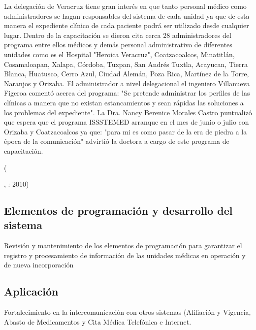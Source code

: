 \begin{center}
  \begin{minipage}{0.9\linewidth}
    \vspace{5pt}%
    {\small
    La delegación de Veracruz tiene gran interés en que tanto personal médico como administradores se hagan responsables del sistema de cada unidad ya que de esta manera el expediente clínico de cada paciente podrá ser utilizado desde cualquier lugar.
    Dentro de la capacitación se dieron cita cerca 28 administradores del programa entre ellos médicos y demás personal administrativo de diferentes unidades como es el Hospital "Heroica Veracruz", Coatzacoalcos, Minatitlán, Cosamaloapan, Xalapa, Córdoba, Tuxpan, San Andrés Tuxtla, Acayucan, Tierra Blanca, Huatusco, Cerro Azul, Ciudad Alemán, Poza Rica, Martínez de la Torre, Naranjos y Orizaba.
    El administrador a nivel delegacional el ingeniero Villanueva Figeroa comentó acerca del programa: "Se pretende administrar los perfiles de las clínicas a manera que no existan estancamientos y sean rápidas las soluciones a los problemas del expediente".
    La Dra. Nancy Berenice Morales Castro puntualizó que espera que el programa ISSSTEMED arranque en el mes de junio o julio con Orizaba y Coatzacoalcos ya que: "para mi es como pasar de la era de piedra a la época de la comunicación" advirtió la doctora a cargo de este programa de capacitación.
    }
    \begin{flushright}
      (\author{Imágen del golfo.},
      : 2010)
    \end{flushright}
      \vspace{5pt}%
  \end{minipage}
\end{center}


\subsection{Elementos de programación y desarrollo del sistema}
 Revisión y mantenimiento de los elementos de programación para garantizar el registro y procesamiento de información de las unidades médicas en operación y de nueva incorporación \cite{ISSTE}

\subsection{Aplicación}
 Fortalecimiento en la intercomunicación con otros sistemas (Afiliación y Vigencia, Abasto de Medicamentos y Cita Médica Telefónica e Internet.


